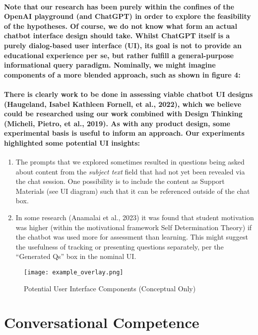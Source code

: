 \documentclass{article}
\begin{document}
\paragraph{Note that our research has been purely within the confines of the OpenAI playground (and ChatGPT) in order to explore the feasibility of the hypotheses. Of course, we do not know what form an actual chatbot interface design should take. Whilst ChatGPT itself is a purely dialog-based user interface (UI), its goal is not to provide an educational experience per se, but rather fulfill a general-purpose informational query paradigm. Nominally, we might imagine components of a more blended approach, such as shown in figure 4:}

\paragraph{There is clearly work to be done in assessing viable chatbot UI designs (Haugeland, Isabel Kathleen Fornell, et al., 2022), which we believe could be researched using our work combined with Design Thinking (Micheli, Pietro, et al., 2019). As with any product design, some experimental basis is useful to inform an approach. Our experiments highlighted some potential UI insights:}

\begin{enumerate}
    \item The prompts that we explored sometimes resulted in questions being asked about content from the \textit{subject text} field that had not yet been revealed via the chat session. One possibility is to include the content as Support Materials (see UI diagram) such that it can be referenced outside of the chat box.
    \item  In some research (Anamalai et al., 2023)  it was found that student motivation was higher (within the motivational framework Self Determination Theory) if the chatbot was used more for assessment than learning. This might suggest the usefulness of tracking or presenting questions separately, per the “Generated Qs'' box in the nominal UI.
\end{enumerate}

\begin{figure}
    \centering
    \texttt{[image: example\_overlay.png]}
    \caption{Potential User Interface Components (Conceptual Only)}
    \label{fig:Example_Overlay}
\end{figure}

\section*{Conversational Competence}
\end{document}
